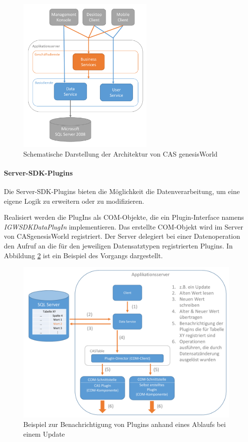 \begin{figure}[H]
	\centering
  \includegraphics[width=0.6\textwidth, width=0.6\textwidth]{pics/GenesisWorld_Architektur.pdf}
	\caption{Schematische Darstellung der Architektur von CAS genesisWorld}
	\label{gw_Architektur}
\end{figure}

\paragraph{Server-SDK-Plugins}

Die Server-SDK-Plugins bieten die Möglichkeit die Datenverarbeitung, um eine eigene Logik zu erweitern oder zu modifizieren. 

Realisiert werden die PlugIns als COM-Objekte, die ein Plugin-Interface namens \textit{IGWSDKDataPlugIn} implementieren. Das erstellte COM-Objekt wird im Server von CASgenesisWorld registriert. Der Server delegiert bei einer Datenoperation den Aufruf an die für den jeweiligen Datensatztypen registrierten Plugins. In Abbildung \ref{gw_plugin} ist ein Beispiel des Vorgangs dargestellt.

\begin{figure}[H]
	\centering
  \includegraphics[width=1.0\textwidth, width=1.0\textwidth]{pics/analyse_plugins.pdf}
	\caption{Beispiel zur Benachrichtigung von Plugins anhand eines Ablaufs bei einem Update}
	\label{gw_plugin}
\end{figure}

